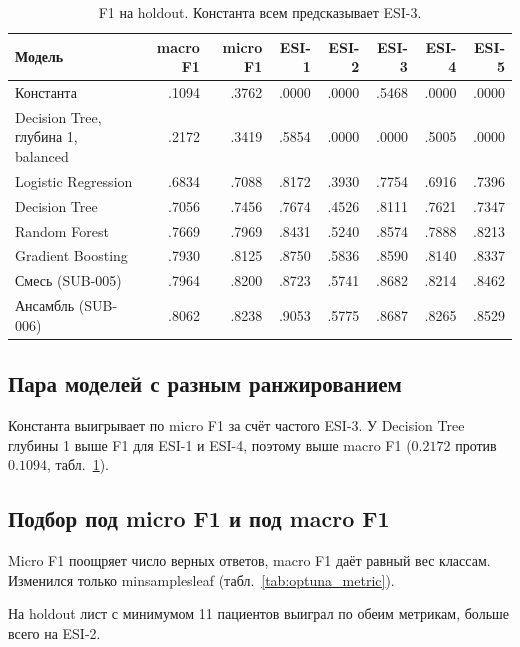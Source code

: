 \documentclass[11pt,a4paper,twocolumn]{article}
\newcommand{\f}[1]{{\ttfamily\def\_{\textunderscore\allowbreak}#1}}
\begin{document}
\begin{table}[!t]
    \centering
    \caption{F1 на holdout. Константа всем предсказывает ESI-3.}\label{tab:metrics}
    {\small \begin{tabular}{@{}lrrrrrrr@{}}
    \toprule
    Модель & macro F1 & micro F1 & ESI-1 & ESI-2 & ESI-3 & ESI-4 & ESI-5\\
    \midrule
    Константа & .1094 & .3762 & .0000 & .0000 & .5468 & .0000 & .0000\\
    Decision Tree, глубина 1, \f{balanced} & .2172 & .3419 & .5854 & .0000 & .0000 & .5005 & .0000\\
    \midrule
    Logistic Regression & .6834 & .7088 & .8172 & .3930 & .7754 & .6916 & .7396\\
    Decision Tree & .7056 & .7456 & .7674 & .4526 & .8111 & .7621 & .7347\\
    Random Forest & .7669 & .7969 & .8431 & .5240 & .8574 & .7888 & .8213\\
    Gradient Boosting & .7930 & .8125 & .8750 & .5836 & .8590 & .8140 & .8337\\
    Смесь (SUB-005) & .7964 & .8200 & .8723 & .5741 & .8682 & .8214 & .8462\\
    Ансамбль (SUB-006) & .8062 & .8238 & .9053 & .5775 & .8687 & .8265 & .8529\\
    \bottomrule
    \end{tabular}}
\end{table}

\subsection{Пара моделей с разным ранжированием}

Константа выигрывает по micro F1 за счёт частого ESI-3. У Decision Tree глубины 1 выше F1 для ESI-1 и ESI-4, поэтому выше macro F1 ($0.2172$ против $0.1094$, табл.~\ref{tab:metrics}).

\subsection{Подбор под micro F1 и под macro F1}

Micro F1 поощряет число верных ответов, macro F1 даёт равный вес классам. Изменился только \f{min\_samples\_leaf} (табл.~\ref{tab:optuna_metric}).

На holdout лист с минимумом 11 пациентов выиграл по обеим метрикам, больше всего на ESI-2.
\end{document}

